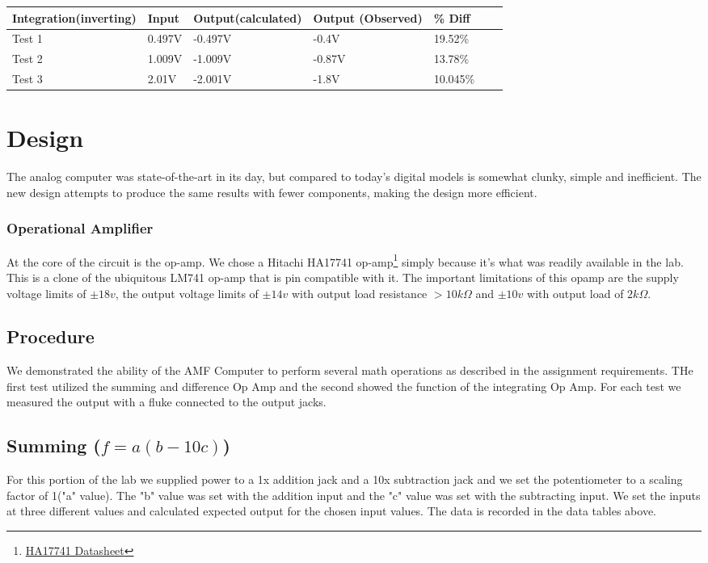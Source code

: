 \documentclass[11pt]{article}
\begin{document}
\begin{table}[h]
	\def\arraystretch{1.2}%
	\begin{tabular}{|l|l|l|l|l|l|l|}
		\hline
		Integration(inverting)	& Input 		& Output(calculated)	& Output (Observed)	 		& \% Diff			\\ \hline
		Test 1					& 0.497V		& -0.497V				& -0.4V						&19.52\%			\\ \hline
		Test 2					& 1.009V		& -1.009V				& -0.87V					&13.78\%			\\ \hline
		Test 3					& 2.01V			& -2.001V				& -1.8V						&10.045\%			\\ \hline
		
		
	\end{tabular}
\end{table}

\section*{Design}
	The analog computer was state-of-the-art in its day, but compared to today's digital models is somewhat clunky, simple and inefficient. The new design attempts to produce the same results with fewer components, making the 	design more efficient.
\subsubsection*{Operational Amplifier}
	At the core of the circuit is the op-amp. We chose a Hitachi HA17741 op-amp\footnote{\href{http://product.ic114.com/PDF/H/e204043_ha17741.pdf}{HA17741 Datasheet}} simply because it's what was readily available in the lab. This is a clone of the ubiquitous LM741 op-amp that is pin compatible with it. The important limitations of this opamp are the supply voltage limits of $\pm 18v$, the output voltage limits of $\pm 14v$ with output load resistance $>10k \Omega$ and $\pm 10v$ with output load of $2k \Omega$.

\subsection*{Procedure}
	We demonstrated the ability of the AMF Computer to perform several math operations as described in the assignment requirements. THe first test utilized the summing and difference Op Amp and the second showed the function of the integrating Op Amp. For each test we measured the output with a fluke connected to the output jacks.
\subsection*{Summing ($f=a(b-10c)$)}
	For this portion of the lab we supplied power to a 1x addition jack and a 10x subtraction jack and we set the potentiometer to a scaling factor of 1("a" value). The "b" value was set with the addition input and the "c" value was set with the subtracting input. We set the inputs at three different values and calculated expected output for the chosen input values. The data is recorded in the data tables above.
\end{document}
